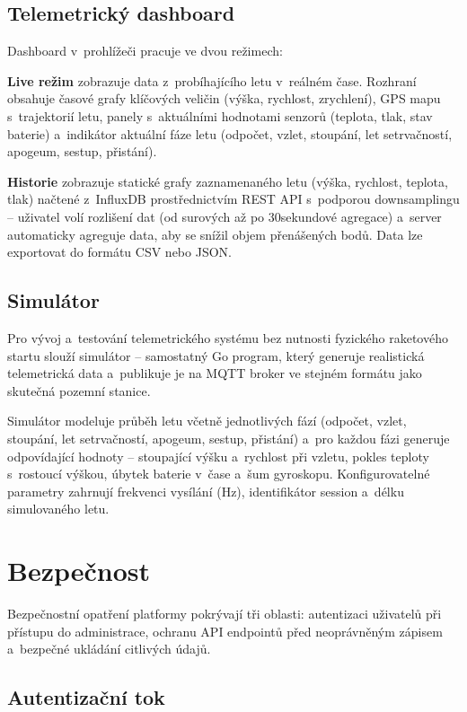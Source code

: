 \subsection{Telemetrický dashboard}

Dashboard v~prohlížeči pracuje ve dvou režimech:

\textbf{Live režim} zobrazuje data z~probíhajícího letu v~reálném čase. Rozhraní obsahuje časové grafy klíčových veličin (výška, rychlost, zrychlení), GPS mapu s~trajektorií letu, panely s~aktuálními hodnotami senzorů (teplota, tlak, stav baterie) a~indikátor aktuální fáze letu (odpočet, vzlet, stoupání, let setrvačností, apogeum, sestup, přistání).

\textbf{Historie} zobrazuje statické grafy zaznamenaného letu (výška, rychlost, teplota, tlak) načtené z~InfluxDB prostřednictvím REST API s~podporou downsamplingu -- uživatel volí rozlišení dat (od surových až po 30sekundové agregace) a~server automaticky agreguje data, aby se snížil objem přenášených bodů. Data lze exportovat do formátu CSV nebo JSON.

\subsection{Simulátor}

Pro vývoj a~testování telemetrického systému bez nutnosti fyzického raketového startu slouží simulátor -- samostatný Go program, který generuje realistická telemetrická data a~publikuje je na MQTT broker ve stejném formátu jako skutečná pozemní stanice.

Simulátor modeluje průběh letu včetně jednotlivých fází (odpočet, vzlet, stoupání, let setrvačností, apogeum, sestup, přistání) a~pro každou fázi generuje odpovídající hodnoty -- stoupající výšku a~rychlost při vzletu, pokles teploty s~rostoucí výškou, úbytek baterie v~čase a~šum gyroskopu. Konfigurovatelné parametry zahrnují frekvenci vysílání (Hz), identifikátor session a~délku simulovaného letu.

\section{Bezpečnost}
\label{sec:navrh-bezpecnost}

Bezpečnostní opatření platformy pokrývají tři oblasti: autentizaci uživatelů při přístupu do administrace, ochranu API endpointů před neoprávněným zápisem a~bezpečné ukládání citlivých údajů.

\subsection{Autentizační tok}

